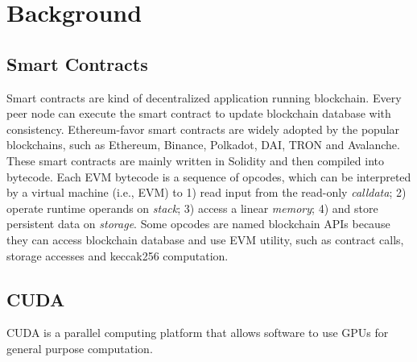 \section{Background}

\subsection{Smart Contracts}
Smart contracts are kind of decentralized application running blockchain. 
Every peer node can execute the smart contract to update blockchain database with consistency. 
Ethereum-favor smart contracts are widely adopted by the popular blockchains, such as Ethereum\cite{wood2014ethereum}, Binance\cite{}, Polkadot\cite{}, DAI\cite{}, TRON\cite{} and Avalanche\cite{}.
These smart contracts are mainly written in Solidity\cite{solidity} and then compiled into bytecode.
Each EVM bytecode is a sequence of opcodes, which can be interpreted by a virtual machine (i.e., EVM) to 1) read input from the read-only \textit{calldata}; 2) operate runtime operands on \textit{stack}; 3) access a linear \textit{memory}; 4) and store persistent data on \textit{storage}.
Some opcodes are named blockchain APIs because they can access blockchain database and use EVM utility, such as contract calls, storage accesses and keccak256 computation. 

\subsection{CUDA}
CUDA is a parallel computing platform that allows software to use GPUs for general purpose computation. 